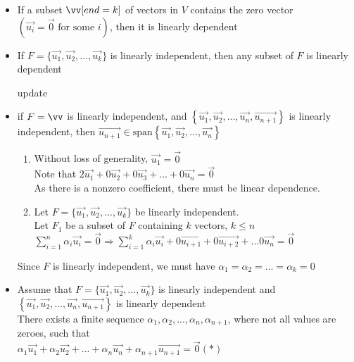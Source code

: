 \documentclass[12pt]{article}
\renewcommand{\v}[1]{\overrightarrow{#1}}
\newcommand{\vectorset}[1]{\{\v{#1_1}, \v{#1_2}, ..., \v{#1_k}\}}
\newenvironment{proof}{\block[Proof]}{\endblock}
\newcommand{\todo}[0]{\text{\textcolor{red}{\textbackslash\textbackslash TODO \ }}}
\newcommand{\bb}[1]{\left\{#1\right\}}
\newcommand{\pp}[1]{\left(#1\right)}
\newcommand{\sspan}[1]{\text{span}\bb{#1}}
\begin{document}
	
	\begin{itemize}
		\item If a subset $\vv[end=k]$ of vectors in $V$ contains the zero vector $\pp{\v{u_i} = \v{0} \text{ for some } i}$, then it is linearly dependent
		
		\item If $F = \vectorset{u}$ is linearly independent, then any subset of $F$ is linearly dependent
		
		
		\todo update
		\item if $F = \vv$ is linearly independent, and $\bb{\v{u_1}, \v{u_2}, ..., \v{u_n}, \v{u_{n+1}}}$ is linearly independent, then $\v{u_{n+1}} \in \sspan{\v{u_1}, \v{u_2}, ..., \v{u_n}}$
		
		\begin{proof}
			\begin{enumerate}
				\item Without loss of generality, $\v{u_1} = \v{0}$ \\
				Note that $2 \v{u_1} + 0 \v{u_2} + 0 \v{u_3} + ... + 0 \v{u_n} = \v{0}$ \\
				As there is a nonzero coefficient, there must be linear dependence.
				
				\item Let $F = \vectorset{u}$ be linearly independent. \\
				Let $F_1$ be a subset of $F$ containing $k$ vectors, $k \le n$ \\
				$\sum_{i=1}^n \alpha_i \v{u_i} = \v{0} \Rightarrow \sum_{i=1}^k \alpha_i \v{u_i} + 0 \v{u_{i+1}} + 0 \v{u_{i+2}} + ... 0 \v{u_n} = \v{0}$
			\end{enumerate}
		\end{proof}
		
		Since $F$ is linearly independent, we must have $\alpha_1 = \alpha_2 = ... = \alpha_k = 0$
		
		\item Assume that $F = \vectorset{u}$ is linearly independent and $\bb{\v{u_1}, \v{u_2}, ..., \v{u_n}, \v{u_{n+1}}}$ is linearly dependent \\
		
		There exists a finite sequence $\alpha_1, \alpha_2, ..., \alpha_n, \alpha_{n+1}$, where not all values are zeroes, such that \\
		$\alpha_1 \v{u_1} + \alpha_2 \v{u_2} + ... + \alpha_n \v{u_n} + \alpha_{n+1} \v{u_{n+1}} = \v{0}(*)$ \\
		

\end{itemize}
\end{document}
